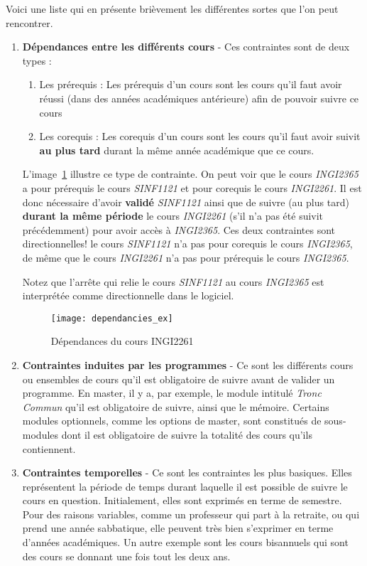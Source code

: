 Voici une liste qui en présente brièvement les différentes sortes que l'on peut rencontrer.
\begin{enumerate}
\item \textbf{Dépendances entre les différents cours} - Ces contraintes  sont de deux types :
	\begin{enumerate}
	\item Les prérequis : Les prérequis d'un cours sont les cours qu'il faut avoir réussi (dans des années académiques antérieure) afin de pouvoir suivre ce cours 
	\item Les corequis : Les corequis d'un cours sont les cours qu'il faut avoir suivit \textbf{au plus tard} durant la même année académique que ce cours.
	\end{enumerate} 

L'image~\ref{fig:cour_dep} illustre ce type de contrainte. On peut voir que le cours \textit{INGI2365} a pour prérequis le cours \textit{SINF1121} et pour corequis le cours \textit{INGI2261}. Il est donc nécessaire d'avoir \textbf{validé} \textit{SINF1121} ainsi que de suivre (au plus tard) \textbf{durant la même période} le cours \textit{INGI2261} (s'il n'a pas été suivit précédemment) pour avoir accès à \textit{INGI2365}. Ces deux contraintes sont directionnelles! le cours \textit{SINF1121} n'a pas pour corequis le cours \textit{INGI2365}, de même que le cours \textit{INGI2261} n'a pas pour prérequis le cours \textit{INGI2365}. 

Notez que l'arrête qui relie le cours \textit{SINF1121} au cours \textit{INGI2365} est interprétée comme directionnelle dans le logiciel. 

\begin{figure}[H]
\centering
\texttt{[image: dependancies\_ex]}
\caption{Dépendances du cours INGI2261}
\label{fig:cour_dep}
\end{figure}

\item \textbf{Contraintes induites par les programmes} - Ce sont les différents cours ou ensembles de cours qu'il est obligatoire de suivre avant de valider un programme. En master, il y a, par exemple, le module intitulé \textit{Tronc Commun} qu'il est obligatoire de suivre, ainsi que le mémoire. Certains modules optionnels, comme les options de master, sont constitués de sous-modules dont il est obligatoire de suivre la totalité des cours qu'ils contiennent. 

\item \textbf{Contraintes temporelles} - Ce sont les contraintes les plus basiques. Elles représentent la période de temps durant laquelle il est possible de suivre le cours en question. Initialement, elles sont exprimés en terme de semestre. Pour des raisons variables, comme un professeur qui part à la retraite, ou qui prend une année sabbatique, elle peuvent très bien s'exprimer en terme d'années académiques. Un autre exemple sont les cours bisannuels qui sont des cours se donnant une fois tout les deux ans. 


\end{enumerate}

